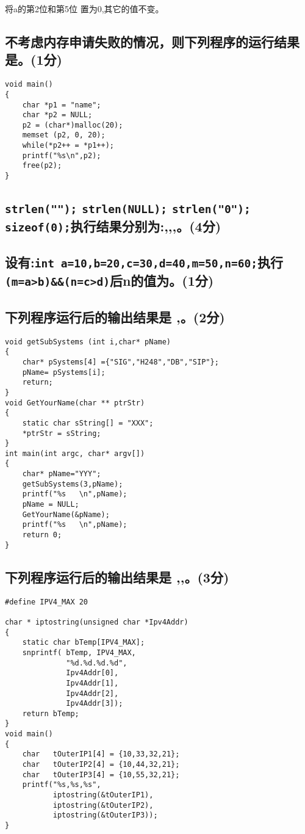 ﻿\documentclass  [11pt,twocolumn]{article}
\begin{document}
将a的第2位和第5位 置为0,其它的值不变\myblank{15em}。

\pagebreak
\subsection{不考虑内存申请失败的情况，则下列程序的运行结果是\myblank{5em}。(1分)}

\begin{lstlisting}
void main() 
{ 
    char *p1 = "name";  
    char *p2 = NULL; 
    p2 = (char*)malloc(20);
    memset (p2, 0, 20); 
    while(*p2++ = *p1++);
    printf("%s\n",p2);
    free(p2);
}
\end{lstlisting}

\subsection{\lstinline{strlen("");} \lstinline{strlen(NULL);} \lstinline{strlen("0");} \lstinline{sizeof(0);}执行结果分别为:\myblank{5em},\myblank{5em},\myblank{5em},\myblank{5em}。(4分)}

\subsection{设有:\lstinline{int a=10,b=20,c=30,d=40,m=50,n=60;}执行\lstinline{(m=a>b)&&(n=c>d)}后n的值为\myblank{5em}。(1分)}

\subsection{下列程序运行后的输出结果是 \myblank{5em},\myblank{5em}。(2分)}
\begin{lstlisting}
void getSubSystems (int i,char* pName)
{
    char* pSystems[4] ={"SIG","H248","DB","SIP"};
    pName= pSystems[i];
    return; 
}
void GetYourName(char ** ptrStr)
{
    static char sString[] = "XXX";
    *ptrStr = sString;
}
int main(int argc, char* argv[])
{
    char* pName="YYY";
    getSubSystems(3,pName); 
    printf("%s   \n",pName);
    pName = NULL;
    GetYourName(&pName);
    printf("%s   \n",pName);
    return 0;
}
\end{lstlisting}

\subsection{下列程序运行后的输出结果是 \myblank{5em},\myblank{5em},\myblank{5em}。(3分)}
\begin{lstlisting}
#define IPV4_MAX 20

char * iptostring(unsigned char *Ipv4Addr)
{
    static char bTemp[IPV4_MAX];
    snprintf( bTemp, IPV4_MAX,
              "%d.%d.%d.%d",
              Ipv4Addr[0],
              Ipv4Addr[1],
              Ipv4Addr[2],
              Ipv4Addr[3]);
    return bTemp;
}
void main()
{
    char   tOuterIP1[4] = {10,33,32,21};
    char   tOuterIP2[4] = {10,44,32,21};
    char   tOuterIP3[4] = {10,55,32,21};
    printf("%s,%s,%s",
           iptostring(&tOuterIP1),
           iptostring(&tOuterIP2),
           iptostring(&tOuterIP3));
}
\end{lstlisting}
\end{document}
